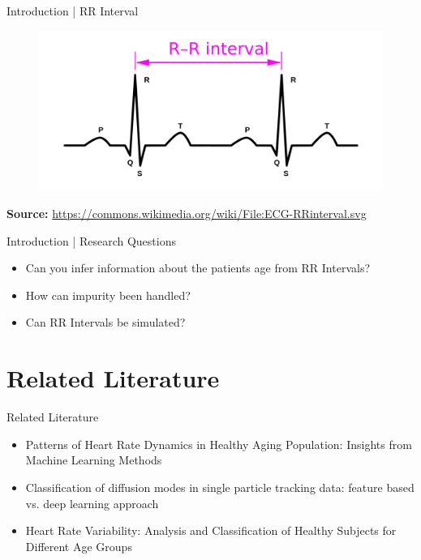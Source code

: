 \documentclass{beamer}
\begin{document}
    \begin{frame}{Introduction | RR Interval}
        \begin{figure}[hbt]
        	\center
        	\includegraphics[width=1.0\textwidth]{img/RRInterval.png}
        	\label{fig:rr}
        \end{figure}
        \textbf{Source:} \url{https://commons.wikimedia.org/wiki/File:ECG-RRinterval.svg}
    \end{frame}
    
    \begin{frame}{Introduction | Research Questions}
        \begin{itemize}
            \item Can you infer information about the patients age from RR Intervals?
            \item How can impurity been handled?
            \item Can RR Intervals be simulated?
        \end{itemize}
    \end{frame}
    
    \section{Related Literature}
    \begin{frame}{Related Literature}
        \begin{itemize}
            \item Patterns of Heart Rate Dynamics in Healthy Aging Population: Insights from Machine Learning Methods \cite{article}
            \item Classification of diffusion modes in single particle tracking data: feature based vs. deep learning approach \cite{unknown}
            \item Heart Rate Variability: Analysis and Classification of Healthy Subjects for Different Age Groups \cite{inproceedings}
        \end{itemize}
    \end{frame}
    
\end{document}
